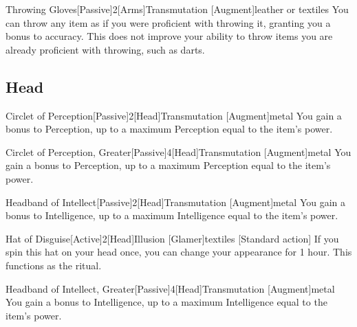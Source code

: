         \begin{magicitemdef}{Throwing Gloves}[Passive]{2}[Arms]{Transmutation [Augment]}{leather or textiles}
             You can throw any item as if you were proficient with throwing it, granting you a  bonus to accuracy.
            This does not improve your ability to throw items you are already proficient with throwing, such as darts.
        \end{magicitemdef}

    \subsection{Head}

        \begin{magicitemdef}{Circlet of Perception}[Passive]{2}[Head]{Transmutation [Augment]}{metal}
             You gain a  bonus to Perception, up to a maximum Perception equal to the item's power.
        \end{magicitemdef}

        \begin{magicitemdef}{Circlet of Perception, Greater}[Passive]{4}[Head]{Transmutation [Augment]}{metal}
             You gain a  bonus to Perception, up to a maximum Perception equal to the item's power.
        \end{magicitemdef}

        \begin{magicitemdef}{Headband of Intellect}[Passive]{2}[Head]{Transmutation [Augment]}{metal}
             You gain a  bonus to Intelligence, up to a maximum Intelligence equal to the item's power.
        \end{magicitemdef}

        \begin{magicitemdef}{Hat of Disguise}[Active]{2}[Head]{Illusion [Glamer]}{textiles}
            [Standard action] If you spin this hat on your head once, you can change your appearance for 1 hour.
            This functions as the  ritual.
        \end{magicitemdef}

        \begin{magicitemdef}{Headband of Intellect, Greater}[Passive]{4}[Head]{Transmutation [Augment]}{metal}
             You gain a  bonus to Intelligence, up to a maximum Intelligence equal to the item's power.
        \end{magicitemdef}

